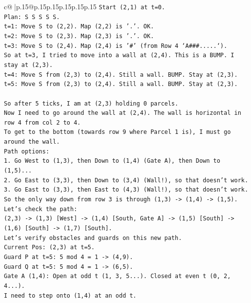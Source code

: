 \documentclass{article}
\begin{document}
{\begin{supertabular}{c@{$\;$}|p{.15\linewidth}@{}p{.15\linewidth}p{.15\linewidth}p{.15\linewidth}p{.15\linewidth}p{.15\linewidth}}
{{{\texttt{Start (2,1) at t=0.} \\
\texttt{Plan: S S S S S.} \\
\texttt{t=1: Move S to (2,2). Map (2,2) is '.'. OK.} \\
\texttt{t=2: Move S to (2,3). Map (2,3) is '.'. OK.} \\
\texttt{t=3: Move S to (2,4). Map (2,4) is '\#' (from Row 4 `A\#\#\#.....`).} \\
\texttt{So at t=3, I tried to move into a wall at (2,4). This is a BUMP. I stay at (2,3).} \\
\texttt{t=4: Move S from (2,3) to (2,4). Still a wall. BUMP. Stay at (2,3).} \\
\texttt{t=5: Move S from (2,3) to (2,4). Still a wall. BUMP. Stay at (2,3).} \\
\\ 
\texttt{So after 5 ticks, I am at (2,3) holding 0 parcels.} \\
\texttt{Now I need to go around the wall at (2,4). The wall is horizontal in row 4 from col 2 to 4.} \\
\texttt{To get to the bottom (towards row 9 where Parcel 1 is), I must go around the wall.} \\
\texttt{Path options:} \\
\texttt{1. Go West to (1,3), then Down to (1,4) (Gate A), then Down to (1,5)...} \\
\texttt{2. Go East to (3,3), then Down to (3,4) (Wall!), so that doesn't work.} \\
\texttt{3. Go East to (3,3), then East to (4,3) (Wall!), so that doesn't work.} \\
\texttt{So the only way down from row 3 is through (1,3) {-}> (1,4) {-}> (1,5).} \\
\texttt{Let's check the path:} \\
\texttt{(2,3) {-}> (1,3) {[}West{]} {-}> (1,4) {[}South, Gate A{]} {-}> (1,5) {[}South{]} {-}> (1,6) {[}South{]} {-}> (1,7) {[}South{]}.} \\
\texttt{Let's verify obstacles and guards on this new path.} \\
\texttt{Current Pos: (2,3) at t=5.} \\
\texttt{Guard P at t=5: 5 mod 4 = 1 {-}> (4,9).} \\
\texttt{Guard Q at t=5: 5 mod 4 = 1 {-}> (6,5).} \\
\texttt{Gate A (1,4): Open at odd t (1, 3, 5...). Closed at even t (0, 2, 4...).} \\
\texttt{I need to step onto (1,4) at an odd t.} \\
}}}
\end{supertabular}}
\end{document}
